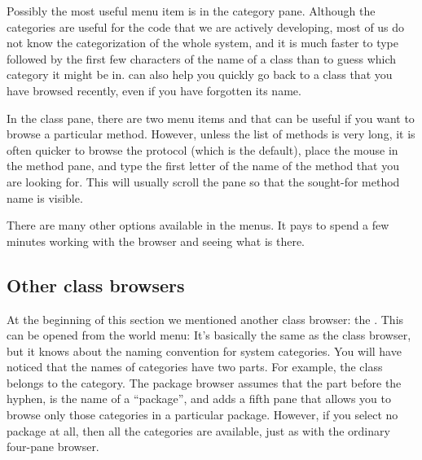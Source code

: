 \documentclass[a4paper,10pt,twoside]{book}
\begin{document}
Possibly the most useful menu item is  in the category pane.  Although the categories are useful for the code that we are actively developing, most of us do not know the categorization of the whole system, and it is much faster to type  followed by the first few characters of the name of a class than to guess which category it might be in.   can also help you quickly go back to a class that you have browsed recently, even if you have forgotten its name.

In the class pane, there are two menu items  and  that can be useful if you want to browse a particular method.  However, unless the list of methods is very long, it is often quicker to browse the  protocol (which is the default), place the mouse in the method pane, and type the first letter of the name of the method that you are looking for.
This will usually scroll the pane so that the sought-for method name is visible.


There are many other options available in the menus.  It pays to spend a few minutes working with the browser and seeing what is there.   


\subsection{Other class browsers}
\label{sec:otherBrowsers}

At the beginning of this section we mentioned another class browser: the . 
This can be opened from the world menu: 
It's basically the same as the class browser, but it knows about the naming convention for system categories.
You will have noticed that the names of categories have two parts.
For example, the  class belongs to the  category.
\label{sec:package-names}
The package browser assumes that the part before the hyphen,  is the name of a ``package'', and adds a fifth pane that allows you to browse only those categories in a particular package.
However, if you select no package at all, then all the categories are available, just as with the ordinary four-pane browser.
\end{document}
